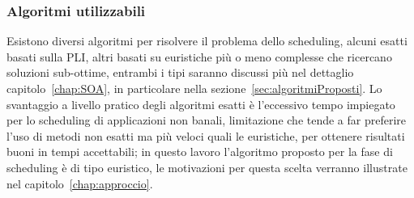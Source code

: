 \subsubsection{Algoritmi utilizzabili}
Esistono diversi algoritmi per risolvere il problema dello scheduling, alcuni esatti 
basati sulla \ac{PLI}, altri basati su euristiche più o meno complesse che ricercano 
soluzioni sub-ottime, entrambi i tipi saranno discussi più nel dettaglio 
capitolo~\ref{chap:SOA}, in particolare nella sezione~\ref{sec:algoritmiProposti}.
Lo svantaggio a livello pratico degli algoritmi esatti è l'eccessivo tempo 
impiegato per lo scheduling di applicazioni non banali, limitazione che tende a far 
preferire l'uso di metodi non esatti ma più veloci quali le euristiche, per ottenere 
risultati buoni in tempi accettabili; in questo lavoro l'algoritmo proposto per la fase di 
scheduling è di tipo euristico, le motivazioni per questa scelta verranno illustrate nel 
capitolo~\ref{chap:approccio}.

